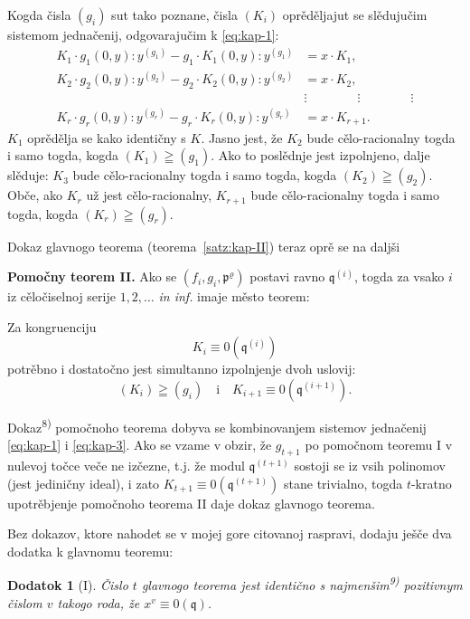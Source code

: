 \documentclass[11pt]{article}
\theoremstyle{plain}
\newtheorem{zusatz}{Dodatok}
\begin{document}
Kogda čisla $(g_{i})$ sut tako poznane, čisla $(K_{i})$ oprěděljajut
se slědujučim sistemom jednačenij, odgovarajučim k \eqref{eq:kap-1}:
\begin{equation}\label{eq:kap-3}
\begin{aligned}
K_1\cdot g_1(0,y):y^{(g_1)} - g_1\cdot K_1(0,y):y^{(g_1)} &= x\cdot K_1,\\
K_2\cdot g_2(0,y):y^{(g_2)} - g_2\cdot K_2(0,y):y^{(g_2)} &= x\cdot K_2,\\
&\vdots \qquad\qquad\vdots\qquad\qquad\vdots\\
K_{r}\cdot g_{r}(0,y):y^{(g_{r})} - g_{r}\cdot K_{r}(0,y):y^{(g_{r})} &= x\cdot K_{r+1}.
\end{aligned}
\end{equation}
$K_{1}$ oprědělja se kako identičny s $K$. Jasno jest, že $K_{2}$
bude cělo-racionalny togda i samo togda, kogda
$(K_1)\geqq(g_1)$. Ako to poslědnje jest izpolnjeno, dalje
slěduje: $K_{3}$ bude cělo-racionalny togda i samo togda, kogda
$(K_2)\geqq(g_2)$. Obče, ako $K_{r}$ už jest cělo-racionalny,
$K_{r+1}$ bude cělo-racionalny togda i samo togda, kogda
$(K_r)\geqq(g_r)$.

Dokaz glavnogo teorema (teorema~\ref{satz:kap-II}) teraz oprě se na
daljši

\smallskip
\textbf{Pomočny teorem II.} Ako se
$(f_i,g_i,\mathfrak{p}^\varrho)$ postavi ravno
$\mathfrak{q}^{(i)}$, togda za vsako $i$ iz cěločiselnoj serije
$1, 2, \ldots$ \textit{in inf.} imaje město teorem:

Za kongruenciju
\[
K_{i} \equiv 0(\mathfrak{q}^{(i)})
\]
potrěbno i dostatočno jest simultanno izpolnjenje dvoh uslovij:
\[
(K_i)\geqq(g_i)\quad \text{i}\quad K_{i+1}\equiv0(\mathfrak{q}^{(i+1)}).
\]

Dokaz\textsuperscript{8)} pomočnoho teorema dobyva se kombinovanjem
sistemov jednačenij \eqref{eq:kap-1} i \eqref{eq:kap-3}. Ako se
vzame v obzir, že $g_{t+1}$ po pomočnom teoremu I v nulevoj točce veče ne
izčezne, t.j. že modul $\mathfrak{q}^{(t+1)}$ sostoji se iz vsih
polinomov (jest jediničny ideal), i zato
$K_{t+1} \equiv 0(\mathfrak{q}^{(t+1)})$ stane trivialno, togda
$t$-kratno upotrěbjenje pomočnoho teorema II daje dokaz glavnogo
teorema.

\smallskip
Bez dokazov, ktore nahodet se v mojej gore citovanoj raspravi,
dodaju ješče dva dodatka k glavnomu teoremu:

\begin{zusatz}[I]
Čislo $t$ glavnogo teorema jest identično s najmenšim\textsuperscript{9)}
pozitivnym čislom $v$ takogo roda, že
$x^{v} \equiv 0(\mathfrak{q})$.
\end{zusatz}
\end{document}
